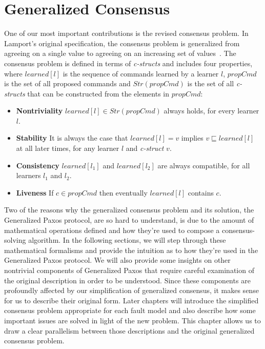 \chapter{Generalized Consensus} \label{problem}

One of our most important contributions is the revised consensus problem. In Lamport's original specification, the consensus problem is generalized from agreeing on a single value to agreeing on an increasing set of values~\cite{Lamport2005}. The consensus problem is defined in terms of \textit{c-structs} and includes four properties, where $learned[l]$ is the sequence of commands learned by a learner $l$, $propCmd$ is the set of all proposed commands and $Str(propCmd)$ is the set of all \textit{c-structs} that can be constructed from the elements in $propCmd$:
\begin{itemize}
	\item \textbf{Nontriviality} $learned[l] \in Str(propCmd)$ always holds, for every learner $l$.
	\item \textbf{Stability} It is always the case that $learned[l] = v$ implies $v \sqsubseteq learned[l]$ at all later times, for any learner $l$ and \textit{c-struct} $v$.
	\item \textbf{Consistency} $learned[l_1]$ and $learned[l_2]$ are always compatible, for all learners $l_1$ and $l_2$.
	\item \textbf{Liveness} If $c \in propCmd$ then eventually $learned[l]$ contains $c$.
\end{itemize}

\par
Two of the reasons why the generalized consensus problem and its solution, the Generalized Paxos protocol, are so hard to understand, is due to the amount of mathematical operations defined and how they're used to compose a consensus-solving algorithm. In the following sections, we will step through these mathematical formalisms and provide the intuition as to how they're used in the Generalized Paxos protocol. We will also provide some insights on other nontrivial components of Generalized Paxos that require careful examination of the original description in order to be understood. Since these components are profoundly affected by our simplification of generalized consensus, it makes sense for us to describe their original form. Later chapters will introduce the simplified consensus problem appropriate for each fault model and also describe how some important issues are solved in light of the new problem. This chapter allows us to draw a clear parallelism between those descriptions and the original generalized consensus problem.

